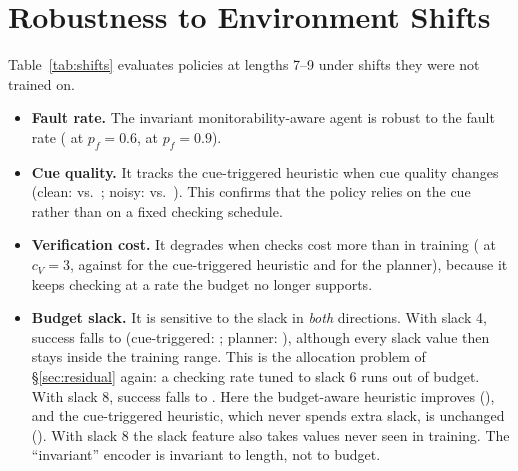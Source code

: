 \begin{table}[H]
\centering
\small
\setlength{\tabcolsep}{3pt}
\caption{As Table~\ref{tab:behaviour}, at lengths 10--14.}
\label{tab:behaviour_xlong}
\resizebox{\linewidth}{!}{}
\end{table}

\section{Robustness to Environment Shifts}
\label{app:shifts}

Table~\ref{tab:shifts} evaluates policies at lengths 7--9 under shifts they were not trained on.
\begin{itemize}
  \item \textbf{Fault rate.} The invariant monitorability-aware agent is robust to the fault rate ( at $p_f{=}0.6$,  at $p_f{=}0.9$).
  \item \textbf{Cue quality.} It tracks the cue-triggered heuristic when cue quality changes (clean:  vs.\ ; noisy:  vs.\ ). This confirms that the policy relies on the cue rather than on a fixed checking schedule.
  \item \textbf{Verification cost.} It degrades when checks cost more than in training ( at $c_V{=}3$, against  for the cue-triggered heuristic and  for the planner), because it keeps checking at a rate the budget no longer supports.
  \item \textbf{Budget slack.} It is sensitive to the slack in \emph{both} directions. With slack 4, success falls to  (cue-triggered: ; planner: ), although every slack value then stays inside the training range. This is the allocation problem of \S\ref{sec:residual} again: a checking rate tuned to slack 6 runs out of budget. With slack 8, success falls to . Here the budget-aware heuristic improves (), and the cue-triggered heuristic, which never spends extra slack, is unchanged (). With slack 8 the slack feature also takes values never seen in training. The ``invariant'' encoder is invariant to length, not to budget.
\end{itemize}

